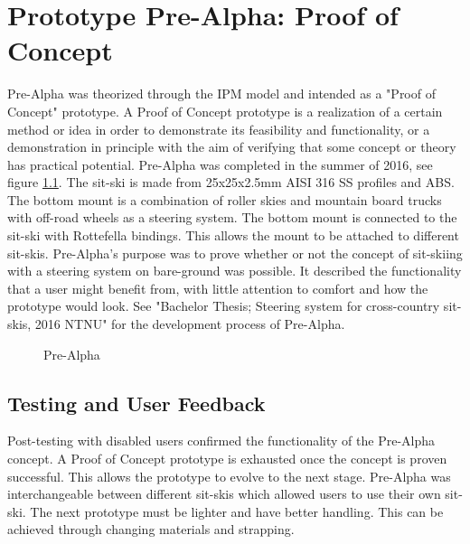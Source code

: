 \chapter{Prototype Pre-Alpha: Proof of Concept}

Pre-Alpha was theorized through the IPM model and intended as a "Proof of Concept" prototype. A Proof of Concept prototype is a realization of a certain method or idea in order to demonstrate its feasibility and functionality, or a demonstration in principle with the aim of verifying that some concept or theory has practical potential. \cite{poc}  Pre-Alpha was completed in the summer of 2016, see figure \ref{bachelorprototype2}. The sit-ski is made from 25x25x2.5mm AISI 316 SS profiles and ABS. The bottom mount is a combination of roller skies and mountain board trucks with off-road wheels as a steering system. The bottom mount is connected to the sit-ski with Rottefella bindings. This allows the mount to be attached to different sit-skis. Pre-Alpha's purpose was to prove whether or not the concept of sit-skiing with a steering system on bare-ground was possible. It described the functionality that a user might benefit from, with little attention to comfort and how the prototype would look. See "Bachelor Thesis; Steering system for cross-country sit-skis, 2016 NTNU" for the development process of Pre-Alpha.  

\vspace{0.5cm}
\begin{figure}[htb!]
    \centering
    {\setlength{\fboxsep}{0pt}\setlength{\fboxrule}{1pt}
    }
    \captionsetup{justification=centering}
    \caption{Pre-Alpha}
    \label{bachelorprototype2}
\end{figure}
\vspace{0.5cm}

\section{Testing and User Feedback}
Post-testing with disabled users confirmed the functionality of the Pre-Alpha concept. A Proof of Concept prototype is exhausted once the concept is proven successful. This allows the prototype to evolve to the next stage. Pre-Alpha was interchangeable between different sit-skis which allowed users to use their own sit-ski. The next prototype must be lighter and have better handling. This can be achieved through changing materials and strapping. 
